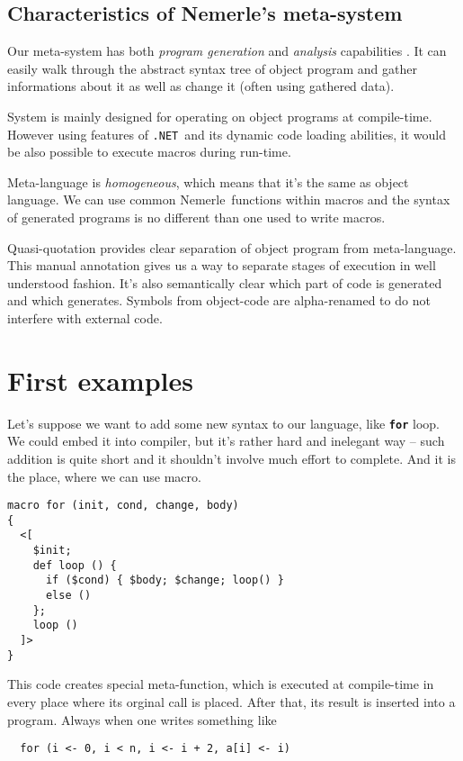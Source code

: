 \documentclass{llncs}
\newcommand{\net}[0]{{\tt .NET}}
\newcommand{\nem}[0]{Nemerle}
\newcommand{\kw}[1]{{\tt \bf #1}}
\begin{document}
\subsection{Characteristics of \nem 's meta-system} 
Our meta-system has both \emph{program generation} and \emph{analysis}
capabilities \cite{Meta:Accomplishments}. It can easily walk through the abstract 
syntax tree of object program and gather informations about it as well as change it 
(often using gathered data).

System is mainly designed for operating on object programs at compile-time.
However using features of \net\ and its dynamic code loading abilities, it would be
also possible to execute macros during run-time. 

Meta-language is \emph{homogeneous}, which means that it's the same as object 
language. We can use common \nem\ functions within macros and the syntax 
of generated programs is no different than one used to write macros.

Quasi-quotation provides clear separation of object program from meta-language.
This manual annotation gives us a way to separate stages of execution in well
understood fashion. It's also semantically clear which part of code is generated 
and which generates. Symbols from object-code are alpha-renamed to do not interfere
with external code. 

\section{First examples}
Let's suppose we want to add some new syntax to our language, like
\kw{for} loop. We could embed it into compiler, but it's rather hard
and inelegant way -- such addition is quite short and it shouldn't
involve much effort to complete. And it is the place, where we can
use macro.

\begin{verbatim}
macro for (init, cond, change, body) 
{
  <[ 
    $init;
    def loop () {
      if ($cond) { $body; $change; loop() } 
      else () 
    }; 
    loop ()
  ]>
}
\end{verbatim}

This code creates special meta-function, which is executed at compile-time
in every place where its orginal call is placed. After that, its result is 
inserted into a program. Always when one writes something like

\begin{verbatim}
  for (i <- 0, i < n, i <- i + 2, a[i] <- i)
\end{verbatim}
\end{document}
